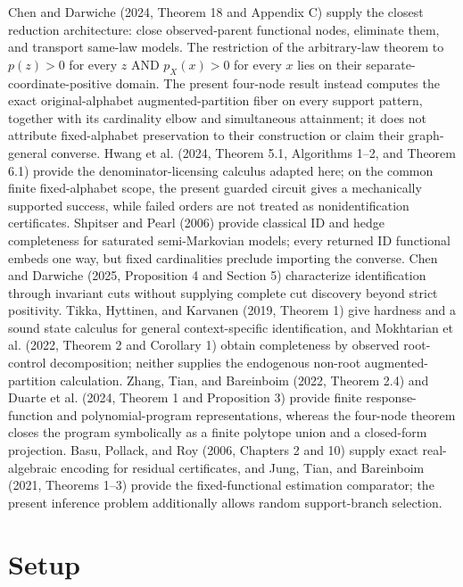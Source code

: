 \documentclass{article}
\begin{document}
Chen and Darwiche (2024, Theorem 18 and Appendix C) supply the closest reduction architecture: close observed-parent functional nodes, eliminate them, and transport same-law models.  The restriction of the arbitrary-law theorem to \(p(z)>0\) for every \(z\) AND \(p_X(x)>0\) for every \(x\) lies on their separate-coordinate-positive domain.  The present four-node result instead computes the exact original-alphabet augmented-partition fiber on every support pattern, together with its cardinality elbow and simultaneous attainment; it does not attribute fixed-alphabet preservation to their construction or claim their graph-general converse.  Hwang et al. (2024, Theorem 5.1, Algorithms 1--2, and Theorem 6.1) provide the denominator-licensing calculus adapted here; on the common finite fixed-alphabet scope, the present guarded circuit gives a mechanically supported success, while failed orders are not treated as nonidentification certificates.  Shpitser and Pearl (2006) provide classical ID and hedge completeness for saturated semi-Markovian models; every returned ID functional embeds one way, but fixed cardinalities preclude importing the converse.  Chen and Darwiche (2025, Proposition 4 and Section 5) characterize identification through invariant cuts without supplying complete cut discovery beyond strict positivity.  Tikka, Hyttinen, and Karvanen (2019, Theorem 1) give hardness and a sound state calculus for general context-specific identification, and Mokhtarian et al. (2022, Theorem 2 and Corollary 1) obtain completeness by observed root-control decomposition; neither supplies the endogenous non-root augmented-partition calculation.  Zhang, Tian, and Bareinboim (2022, Theorem 2.4) and Duarte et al. (2024, Theorem 1 and Proposition 3) provide finite response-function and polynomial-program representations, whereas the four-node theorem closes the program symbolically as a finite polytope union and a closed-form projection.  Basu, Pollack, and Roy (2006, Chapters 2 and 10) supply exact real-algebraic encoding for residual certificates, and Jung, Tian, and Bareinboim (2021, Theorems 1--3) provide the fixed-functional estimation comparator; the present inference problem additionally allows random support-branch selection.

\section{Setup}
\end{document}
